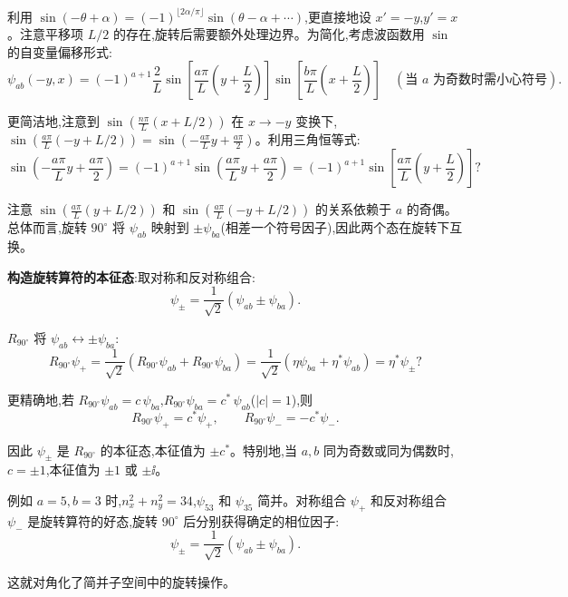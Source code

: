 \begin{question}
\begin{solution}
	利用 $\sin(-\theta+\alpha) = (-1)^{\lfloor 2\alpha/\pi\rfloor}\sin(\theta-\alpha+\cdots)$,更直接地设 $x'=-y$,$y'=x$。注意平移项 $L/2$ 的存在,旋转后需要额外处理边界。为简化,考虑波函数用 $\sin$ 的自变量偏移形式:
	\[
	\psi_{ab}(-y,x) = (-1)^{a+1}\frac{2}{L}\sin\!\left[\frac{a\pi}{L}\left(y+\frac{L}{2}\right)\right]
	\sin\!\left[\frac{b\pi}{L}\left(x+\frac{L}{2}\right)\right] \quad (\text{当 } a\text{ 为奇数时需小心符号}).
	\]

	更简洁地,注意到 $\sin(\frac{n\pi}{L}(x+L/2))$ 在 $x\to -y$ 变换下,$\sin(\frac{a\pi}{L}(-y+L/2)) = \sin(-\frac{a\pi}{L}y+\frac{a\pi}{2})$。利用三角恒等式:
	\[
	\sin\!\left(-\frac{a\pi}{L}y+\frac{a\pi}{2}\right) = (-1)^{a+1}\sin\!\left(\frac{a\pi}{L}y+\frac{a\pi}{2}\right) = (-1)^{a+1}\sin\!\left[\frac{a\pi}{L}\left(y+\frac{L}{2}\right)\right]?
	\]

	注意 $\sin(\frac{a\pi}{L}(y+L/2))$ 和 $\sin(\frac{a\pi}{L}(-y+L/2))$ 的关系依赖于 $a$ 的奇偶。总体而言,旋转 $90^\circ$ 将 $\psi_{ab}$ 映射到 $\pm\psi_{ba}$(相差一个符号因子),因此两个态在旋转下互换。

	\textbf{构造旋转算符的本征态}:取对称和反对称组合:
	\[
	\psi_\pm = \frac{1}{\sqrt{2}}(\psi_{ab}\pm\psi_{ba}).
	\]

	$R_{90^\circ}$ 将 $\psi_{ab}\leftrightarrow\pm\psi_{ba}$:
	\[
	R_{90^\circ}\psi_+ = \frac{1}{\sqrt{2}}(R_{90^\circ}\psi_{ab}+R_{90^\circ}\psi_{ba})
	= \frac{1}{\sqrt{2}}(\eta\psi_{ba}+\eta^*\psi_{ab}) = \eta^*\psi_\pm?
	\]

	更精确地,若 $R_{90^\circ}\psi_{ab} = c\,\psi_{ba}$,$R_{90^\circ}\psi_{ba} = c^*\,\psi_{ab}$($|c|=1$),则
	\[
	R_{90^\circ}\psi_+ = c^*\psi_+,\qquad
	R_{90^\circ}\psi_- = -c^*\psi_-.
	\]

	因此 $\psi_\pm$ 是 $R_{90^\circ}$ 的本征态,本征值为 $\pm c^*$。特别地,当 $a,b$ 同为奇数或同为偶数时,$c=\pm1$,本征值为 $\pm1$ 或 $\pm\ii$。

	例如 $a=5,b=3$ 时,$n_x^2+n_y^2=34$,$\psi_{53}$ 和 $\psi_{35}$ 简并。对称组合 $\psi_+$ 和反对称组合 $\psi_-$ 是旋转算符的好态,旋转 $90^\circ$ 后分别获得确定的相位因子:
	\[
	\boxed{\psi_\pm = \frac{1}{\sqrt{2}}(\psi_{ab}\pm\psi_{ba})}.
	\]

	这就对角化了简并子空间中的旋转操作。
	\end{solution}
\end{question}

